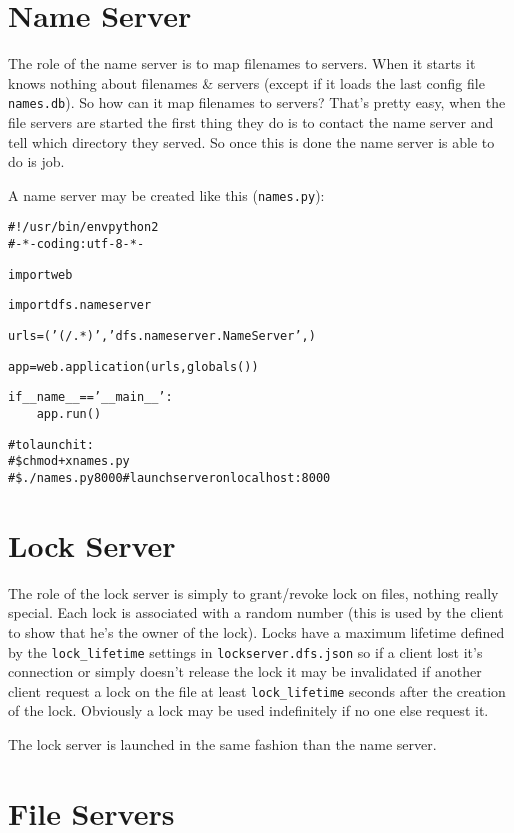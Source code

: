 \documentclass[12pt,a4paper]{report}
\begin{document}
	\section*{Name Server}
	
		The role of the name server is to map filenames to servers. When it starts it knows nothing about filenames \& servers (except if it loads the last config file \texttt{names.db}). So how can it map filenames to servers? That's pretty easy, when the file servers are started the first thing they do is to contact the name server and tell which directory they served. So once this is done the name server is able to do is job.
		
		A name server may be created like this (\texttt{names.py}):
		
		\begin{alltt}
			\rmfamily
#!/usr/bin/env python2
#-*- coding: utf-8 -*-

import web

import dfs.nameserver

urls = ('(/.*)', 'dfs.nameserver.NameServer',)

app = web.application(urls, globals())


if \_\_name\_\_ == '\_\_main\_\_':
\ \ \ \ app.run()

# to launch it:
# \$ chmod +x names.py
# \$ ./names.py 8000 # launch server on localhost:8000
		\end{alltt}
	
	\section*{Lock Server}

		The role of the lock server is simply to grant/revoke lock on files, nothing really special. Each lock is associated with a random number (this is used by the client to show that he's the owner of the lock). Locks have a maximum lifetime defined by the \texttt{lock\_lifetime} settings in \texttt{lockserver.dfs.json} so if a client lost it's connection or simply doesn't release the lock it may be invalidated if another client request a lock on the file at least \texttt{lock\_lifetime} seconds after the creation of the lock. Obviously a lock may be used indefinitely if no one else request it.
		
		The lock server is launched in the same fashion than the name server.
	
	\section*{File Servers}
	
\end{document}
